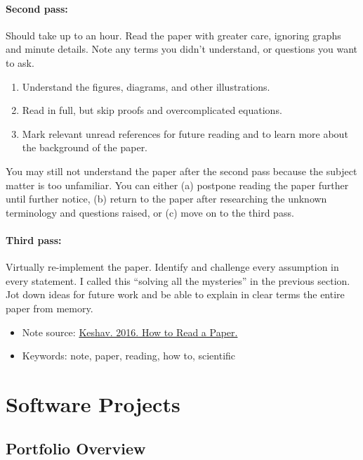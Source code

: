 \paragraph*{Second pass: } Should take up to an hour. Read the paper with greater care, ignoring graphs and minute details. Note any terms you didn't understand, or questions you want to ask.
\begin{enumerate}
	\item Understand the figures, diagrams, and other illustrations.  
	\item Read in full, but skip proofs and overcomplicated equations.
	\item Mark relevant unread references for future reading and to learn more about the background of the paper.
\end{enumerate}
You may still not understand the paper after the second pass because the subject matter is too unfamiliar. You can either (a) postpone reading the paper further until further notice, (b) return to the paper after researching the unknown terminology and questions raised, or (c) move on to the third pass.  

\paragraph*{Third pass: }Virtually re-implement the paper. Identify and challenge every assumption in every statement. I called this ``solving all the mysteries'' in the previous section. Jot down ideas for future work and be able to explain in clear terms the entire paper from memory.   

\begin{itemize}
	\item Note source: \href{http://blizzard.cs.uwaterloo.ca/keshav/home/Papers/data/07/paper-reading.pdf}{Keshav. 2016. How to Read a Paper.}
	\item Keywords: note, paper, reading, how to, scientific 
\end{itemize}


\section{Software Projects}

\subsection{Portfolio Overview}

